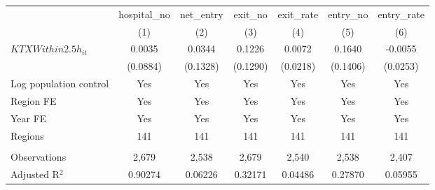 \begingroup
\centering
\begin{tabular}{lcccccc}
   \toprule
                          & hospital\_no  & net\_entry  & exit\_no  & exit\_rate  & entry\_no  & entry\_rate \\    
                          & (1)           & (2)         & (3)       & (4)         & (5)        & (6)\\  
   \midrule 
   $KTXWithin2.5h_{it}$   & 0.0035        & 0.0344      & 0.1226    & 0.0072      & 0.1640     & -0.0055\\   
                          & (0.0884)      & (0.1328)    & (0.1290)  & (0.0218)    & (0.1406)   & (0.0253)\\   
   Log population control & Yes           & Yes         & Yes       & Yes         & Yes        & Yes\\  
   Region FE              & Yes           & Yes         & Yes       & Yes         & Yes        & Yes\\  
   Year FE                & Yes           & Yes         & Yes       & Yes         & Yes        & Yes\\  
   Regions                & 141           & 141         & 141       & 141         & 141        & 141\\  
    \\
   Observations           & 2,679         & 2,538       & 2,679     & 2,540       & 2,538      & 2,407\\  
   Adjusted R$^2$         & 0.90274       & 0.06226     & 0.32171   & 0.04486     & 0.27870    & 0.05955\\  
   \bottomrule
\end{tabular}
\par\endgroup
